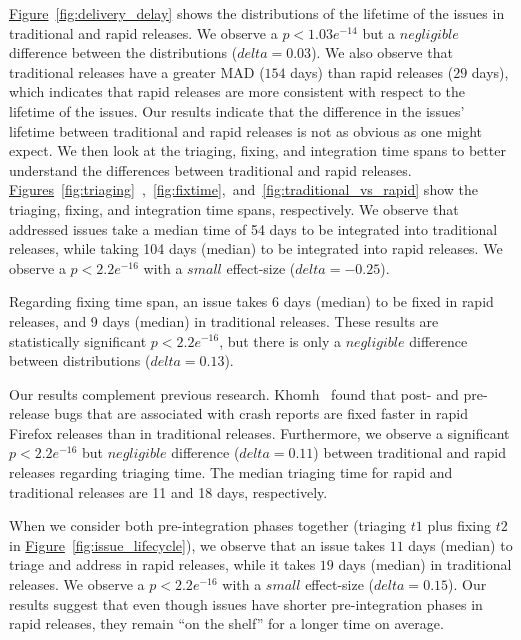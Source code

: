 \noindent{}
\hyperref[fig:delivery_delay]{Figure}~\ref{fig:delivery_delay} shows the
distributions of the lifetime of the issues in traditional and rapid releases.
We observe a $p<1.03e^{-14}$ but a $negligible$ difference between the
distributions ($\textit{delta}=0.03$). We also observe that traditional releases
have a greater MAD ($154$ days) than rapid releases ($29$ days), which indicates
that rapid releases are more consistent with respect to the lifetime of the
issues. Our results indicate that the difference in the issues' lifetime between
traditional and rapid releases is not as obvious as one might expect. We then
look at the triaging, fixing, and integration time spans to better understand
the differences between traditional and rapid releases.\\

\noindent{}
\hyperref[fig:triaging]{Figures}~\ref{fig:triaging}~,~\ref{fig:fixtime},~and~\ref{fig:traditional_vs_rapid}
show the triaging, fixing, and integration time spans, respectively. We observe
that addressed issues take a median time of 54 days to be integrated into
traditional releases, while taking 104 days (median) to be integrated into rapid
releases. We observe a $p<2.2e^{-16}$ with a $small$ effect-size
($delta=-0.25$).

Regarding fixing time span, an issue takes 6 days (median) to be fixed in rapid
releases, and 9 days (median) in traditional releases. These results are
statistically significant $p<2.2e^{-16}$, but there is only a $negligible$
difference between distributions ($delta=0.13$). 

Our results complement previous research. Khomh~\etal \cite{khomh2012faster}
found that post- and pre-release bugs that are associated with crash reports are
fixed faster in rapid Firefox releases than in traditional releases.
Furthermore, we observe a significant $p<2.2e^{-16}$ but $negligible$ difference
($\textit{delta}=0.11$) between traditional and rapid releases regarding
triaging time. The median triaging time for rapid and traditional releases are
11 and 18 days, respectively.

When we consider both pre-integration phases together (triaging $t1$ plus fixing
$t2$ in \hyperref[fig:issue_lifecycle]{Figure}~\ref{fig:issue_lifecycle}), we
observe that an issue takes $11$ days (median) to triage and address in rapid
releases, while it takes $19$ days (median) in traditional releases. We observe
a $p<2.2e^{-16}$ with a $small$ effect-size ($delta=0.15$). Our results suggest
that even though issues have shorter pre-integration phases in rapid releases,
they remain ``on the shelf'' for a longer time on average.

